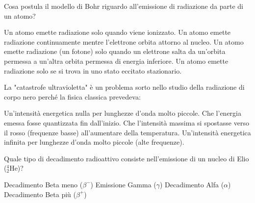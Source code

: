 \documentclass{exam}%
\begin{document}
\begin{questions}
\begin{choices}
\end{choices}%
\question Cosa postula il modello di Bohr riguardo all'emissione di radiazione da parte di un atomo?%
\vspace{0.2em}%
\begin{choices}%
\choice Un atomo emette radiazione solo quando viene ionizzato.%
\choice Un atomo emette radiazione continuamente mentre l'elettrone orbita attorno al nucleo.%
\choice Un atomo emette radiazione (un fotone) solo quando un elettrone salta da un'orbita permessa a un'altra orbita permessa di energia inferiore.%
\choice Un atomo emette radiazione solo se si trova in uno stato eccitato stazionario.%
\end{choices}%
\question La "catastrofe ultravioletta" è un problema sorto nello studio della radiazione di corpo nero perché la fisica classica prevedeva:%
\vspace{0.2em}%
\begin{choices}%
\choice Un'intensità energetica nulla per lunghezze d'onda molto piccole.%
\choice Che l'energia emessa fosse quantizzata fin dall'inizio.%
\choice Che l'intensità massima si spostasse verso il rosso (frequenze basse) all'aumentare della temperatura.%
\choice Un'intensità energetica infinita per lunghezze d'onda molto piccole (alte frequenze).%
\end{choices}%
\question Quale tipo di decadimento radioattivo consiste nell'emissione di un nucleo di Elio ($^4_2\text{He}$)?%
\vspace{0.2em}%
\begin{multicols}{2}%
\begin{choices}%
\choice Decadimento Beta meno ($\beta^-$)%
\choice Emissione Gamma ($\gamma$)%
\choice Decadimento Alfa ($\alpha$)%
\choice Decadimento Beta più ($\beta^+$)%
\end{choices}%
\end{multicols}%
\end{questions}%
\end{document}
